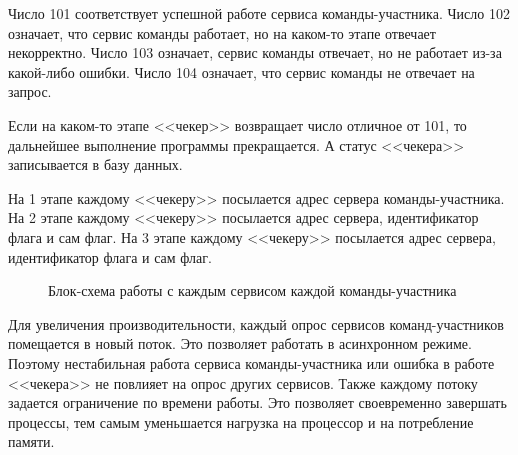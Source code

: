 \clearpage



Число 101 соответствует успешной работе сервиса команды-участника. Число 102 означает, что сервис команды работает, но на каком-то этапе отвечает некорректно. Число 103 означает, сервис команды отвечает, но не работает из-за какой-либо ошибки. Число 104 означает, что сервис команды не отвечает на запрос. 

Если на каком-то этапе <<чекер>> возвращает число отличное от 101, то дальнейшее выполнение программы прекращается. А статус <<чекера>> записывается в базу данных.

На 1 этапе каждому <<чекеру>> посылается адрес сервера команды-участника. 
На 2 этапе каждому <<чекеру>> посылается адрес сервера, идентификатор флага и сам флаг. 
На 3 этапе каждому <<чекеру>> посылается адрес сервера, идентификатор флага и сам флаг.

\begin{figure}[h!]
\caption{Блок-схема работы с каждым сервисом каждой команды-участника}
\end{figure}
\clearpage

Для увеличения производительности, каждый опрос сервисов команд-участников помещается в новый поток. Это позволяет работать в асинхронном режиме. Поэтому нестабильная работа сервиса команды-участника или ошибка в работе <<чекера>> не повлияет на опрос других сервисов. Также каждому потоку задается ограничение по времени работы. Это позволяет своевременно завершать процессы, тем самым уменьшается нагрузка на процессор и на потребление памяти.

